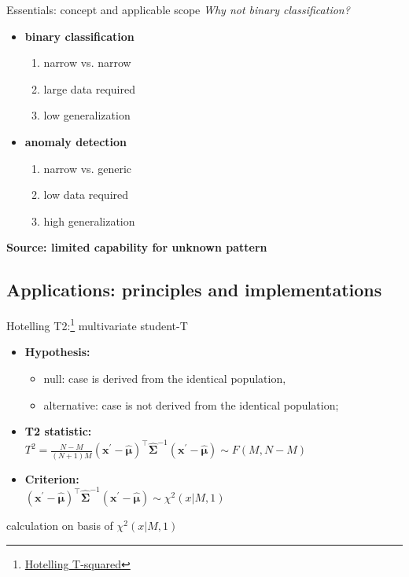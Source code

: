 \documentclass[11pt]{beamer}
\newcommand{\asred}[1]{{\color{red}#1}}
\newcommand{\uniitem}[1]{\begin{itemize}\item #1 \end{itemize}}
\newcommand{\ftref}[2]{{\color{blue}\footnotesize \href{#1}{#2}}}
\begin{document}
\begin{frame}{Essentials: concept and applicable scope}
	\emph{Why not binary classification?}\\
	\begin{minipage}[t]{0.5\textwidth}
		\uniitem{\textbf{binary classification}\\
			\begin{enumerate}
				\item narrow vs. narrow
				\item large data required
				\item low generalization
			\end{enumerate}}
    \end{minipage}%
    \hfill
    \begin{minipage}[t]{0.45\textwidth}
    	\uniitem{\textbf{anomaly detection}\\
			\begin{enumerate}
				\item narrow vs. generic
				\item low data required
				\item high generalization
			\end{enumerate}}
    \end{minipage}
    \vfill
    \asred{\textbf{Source: limited capability for unknown pattern}}
\end{frame}

\subsection{Applications: principles and implementations}

\begin{frame}{Hotelling T2:\footnote[frame]{\ftref{https://informatics.readthedocs.io/en/latest/supplement/supp\_b2.html\#id3}{Hotelling T-squared}} multivariate student-T}
	\uniitem{\textbf{Hypothesis:}
		\uniitem{null: case is derived from the identical population,}
		\uniitem{alternative: case is not derived from the identical population;}}
	\uniitem{\textbf{T2 statistic:}\\
		\qquad $T^2 = \frac{N-M}{(N+1)M} (\boldsymbol{x}^\prime - \hat{\boldsymbol{\mu}})^\top \hat{\boldsymbol{\Sigma}}^{-1} (\boldsymbol{x}^\prime - \hat{\boldsymbol{\mu}}) \sim F(M, N-M)$}
	\uniitem{\textbf{Criterion:}\\
		\qquad $(\boldsymbol{x}^\prime - \hat{\boldsymbol{\mu}})^\top \hat{\boldsymbol{\Sigma}}^{-1} (\boldsymbol{x}^\prime - \hat{\boldsymbol{\mu}}) \sim \chi^2 (x | M, 1)$}
	\vfill
	calculation on basis of $\chi^2 (x | M, 1)$
\end{frame}
\end{document}
